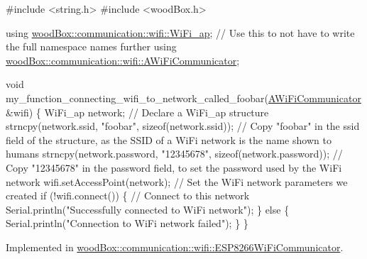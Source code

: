 \begin{DoxyCode}
\textcolor{preprocessor}{#include <string.h>}
\textcolor{preprocessor}{#include <woodBox.h>}

\textcolor{keyword}{using} \mbox{\hyperlink{structwood_box_1_1communication_1_1wifi_1_1s__wifi__access__point}{woodBox::communication::wifi::WiFi\_ap}}; \textcolor{comment}{// Use this to not have
       to write the full namespace names further}
\textcolor{keyword}{using} \mbox{\hyperlink{classwood_box_1_1communication_1_1wifi_1_1_a_wi_fi_communicator}{woodBox::communication::wifi::AWiFiCommunicator}};

\textcolor{keywordtype}{void} my\_function\_connecting\_wifi\_to\_network\_called\_foobar(\mbox{\hyperlink{classwood_box_1_1communication_1_1wifi_1_1_a_wi_fi_communicator_a9d1dc13ca9243170b04211bef2b86ed2}{AWiFiCommunicator}} &wifi) \{
  WiFi\_ap network; \textcolor{comment}{// Declare a WiFi\_ap structure}
  strncpy(network.ssid, \textcolor{stringliteral}{"foobar"}, \textcolor{keyword}{sizeof}(network.ssid)); \textcolor{comment}{// Copy "foobar" in the ssid field of the
       structure, as the SSID of a WiFi network is the name shown to humans}
  strncpy(network.password, \textcolor{stringliteral}{"12345678"}, \textcolor{keyword}{sizeof}(network.password)); \textcolor{comment}{// Copy "12345678" in the password
       field, to set the password used by the WiFi network}
  wifi.setAccessPoint(network); \textcolor{comment}{// Set the WiFi network parameters we created}
  \textcolor{keywordflow}{if} (!wifi.connect()) \{ \textcolor{comment}{// Connect to this network}
    Serial.println(\textcolor{stringliteral}{"Successfully connected to WiFi network"});
  \} \textcolor{keywordflow}{else} \{
    Serial.println(\textcolor{stringliteral}{"Connection to WiFi network failed"});
  \}
\}
\end{DoxyCode}
 

Implemented in \mbox{\hyperlink{classwood_box_1_1communication_1_1wifi_1_1_e_s_p8266_wi_fi_communicator_ab3e1f12a851dc3ed6eb487c39178cb6f}{wood\+Box\+::communication\+::wifi\+::\+E\+S\+P8266\+Wi\+Fi\+Communicator}}.

\mbox{\label{classwood_box_1_1communication_1_1wifi_1_1_a_wi_fi_communicator_ad8c31be391a58bfabe21c5ef99a94719}} 
